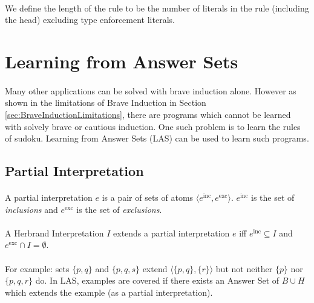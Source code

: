 \documentclass{article}
\theoremstyle{plain}
\theoremstyle{definition}
\begin{document}
\begin{multicols}{2}
\paragraph{} We define the length of the rule to be the number of literals in the rule (including the head) excluding type enforcement literals.

\section{Learning from Answer Sets}

\paragraph{} Many other applications can be solved with brave induction alone. However as shown in the limitations of Brave Induction in Section \ref{sec:BraveInductionLimitations}, there are programs which cannot be learned with solvely brave or cautious induction. One such problem is to learn the rules of sudoku. Learning from Answer Sets (LAS) can be used to learn such programs\cite{law14}.

\subsection{Partial Interpretation}

\paragraph{} A partial interpretation $e$ is a pair of sets of atoms $\langle e^\text{inc}, e^\text{exc}\rangle $. $e^\text{inc}$ is the set of \textit{inclusions} and $e^\text{exc}$ is the set of \textit{exclusions}.

\paragraph{} A Herbrand Interpretation $I$ extends a partial interpretation $e$ iff $e^\text{inc} \subseteq I$ and $e^\text{exc} \cap I = \emptyset$.

\paragraph{} For example: sets $\{p, q\}$ and $\{p, q, s\}$ extend $\langle \{p, q\}, \{r\} \rangle$ but not neither $\{p\}$ nor $\{p, q, r\}$ do. In LAS, examples are covered if there exists an Answer Set of $B \cup H$ which extends the example (as a partial interpretation).


\end{multicols}
\end{document}
